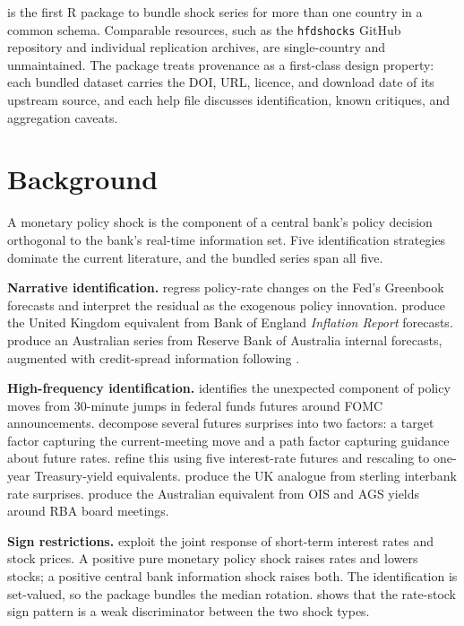  is the first R package to bundle shock series for more than one country in a common schema. Comparable resources, such as the \texttt{hfdshocks} GitHub repository and individual replication archives, are single-country and unmaintained. The package treats provenance as a first-class design property: each bundled dataset carries the DOI, URL, licence, and download date of its upstream source, and each help file discusses identification, known critiques, and aggregation caveats.

\section{Background}\label{background}

A monetary policy shock is the component of a central bank's policy decision orthogonal to the bank's real-time information set. Five identification strategies dominate the current literature, and the bundled series span all five.

\textbf{Narrative identification.} \citet{romer2004new} regress policy-rate changes on the Fed's Greenbook forecasts and interpret the residual as the exogenous policy innovation. \citet{cloyne2016macroeconomic} produce the United Kingdom equivalent from Bank of England \emph{Inflation Report} forecasts. \citet{beckers2020credit} produce an Australian series from Reserve Bank of Australia internal forecasts, augmented with credit-spread information following \citet{hambur2023monetary}.

\textbf{High-frequency identification.} \citet{kuttner2001monetary} identifies the unexpected component of policy moves from 30-minute jumps in federal funds futures around FOMC announcements. \citet{gurkaynak2005actions} decompose several futures surprises into two factors: a target factor capturing the current-meeting move and a path factor capturing guidance about future rates. \citet{nakamura2018high} refine this using five interest-rate futures and rescaling to one-year Treasury-yield equivalents. \citet{cesabianchi2020monetary} produce the UK analogue from sterling interbank rate surprises. \citet{hambur2023monetary} produce the Australian equivalent from OIS and AGS yields around RBA board meetings.

\textbf{Sign restrictions.} \citet{jarocinski2020deconstructing} exploit the joint response of short-term interest rates and stock prices. A positive pure monetary policy shock raises rates and lowers stocks; a positive central bank information shock raises both. The identification is set-valued, so the package bundles the median rotation. \citet{acosta2023perceived} shows that the rate-stock sign pattern is a weak discriminator between the two shock types.

